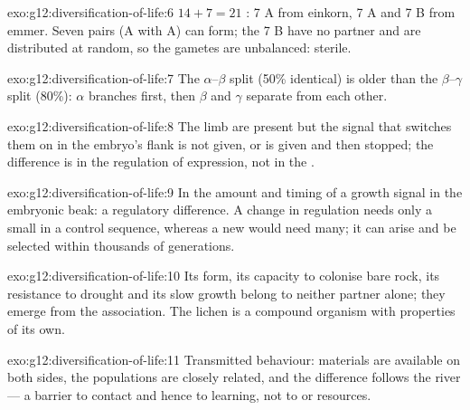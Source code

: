 \begin{solution}{exo:g12:diversification-of-life:6}
$14 + 7 = 21$ : 7 A from einkorn, 7 A and 7 B from emmer.
Seven pairs (A with A) can form; the 7 B  have no partner
and are distributed at random, so the gametes are unbalanced: sterile.
\end{solution}

\begin{solution}{exo:g12:diversification-of-life:7}
The $\alpha$--$\beta$ split (50\% identical) is older than the
$\beta$--$\gamma$ split (80\%): $\alpha$ branches first, then $\beta$
and $\gamma$ separate from each other.
\end{solution}

\begin{solution}{exo:g12:diversification-of-life:8}
The limb  are present but the signal that switches them on in
the embryo's flank is not given, or is given and then stopped; the
difference is in the regulation of expression, not in the .
\end{solution}

\begin{solution}{exo:g12:diversification-of-life:9}
In the amount and timing of a growth signal in the embryonic beak: a
regulatory difference. A change in regulation needs only a small
 in a control sequence, whereas a new  would need many;
it can arise and be selected within thousands of generations.
\end{solution}

\begin{solution}{exo:g12:diversification-of-life:10}
Its form, its capacity to colonise bare rock, its resistance to
drought and its slow growth belong to neither partner alone; they
emerge from the association. The lichen is a compound organism with
properties of its own.
\end{solution}

\begin{solution}{exo:g12:diversification-of-life:11}
Transmitted behaviour: materials are available on both sides, the
populations are closely related, and the difference follows the
river --- a barrier to contact and hence to learning, not to  or
resources.
\end{solution}

